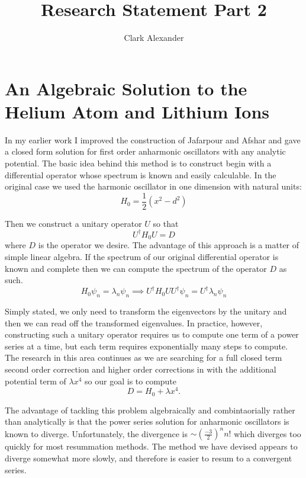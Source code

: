 \documentclass[10 pt]{amsart}
\theoremstyle{definition}
\theoremstyle{remark}
\numberwithin{equation}{subsection}
\begin{document}
\title{Research Statement Part 2}
\author{Clark Alexander}

 \maketitle

\section*{An Algebraic Solution to the Helium Atom and Lithium Ions}
\indent In my earlier work I improved the construction of Jafarpour and Afshar and gave a closed form solution for first order anharmonic oscillators with any analytic potential.  The basic idea behind this method is to construct begin with a differential operator whose spectrum is known and easily calculable.  In the original case we used the harmonic oscillator in one dimension with natural units:
\[
H_0 = \frac{1}{2}(x^2-d^2)
\]

Then we construct a unitary operator $U$ so that
\[
U^{\dagger} H_0 U = D
\]
where $D$ is the operator we desire.  The advantage of this approach is a matter of simple linear algebra.  If the spectrum of our original differential operator is known and complete then we can compute the spectrum of the operator $D$ as such.
\[
H_0 \psi_n = \lambda_n \psi_n \implies U^{\dagger}H_0 U U^{\dagger}\psi_n = U^{\dagger} \lambda_n \psi_n
\]

Simply stated, we only need to transform the eigenvectors by the unitary and then we can read off the transformed eigenvalues.  In practice, however, constructing such a unitary operator requires us to compute one term of a power series at a time, but each term requires exponentially many steps to compute.  The research in this area continues as we are searching for a full closed term second order correction and higher order corrections in with the additional potential term of $\lambda x^4$ so our goal is to compute
\[
D = H_0 +\lambda x^4.
\]

The advantage of tackling this problem algebraically and combintaorially rather than analytically is that the power series solution for anharmonic oscillators is known to diverge.  Unfortunately, the divergence is $\sim \left(\frac{-3}{2}\right)^n n!$ which diverges too quickly for most resummation methods.  The method we have devised appears to diverge somewhat more slowly, and therefore is easier to resum to a convergent series.
\end{document}
